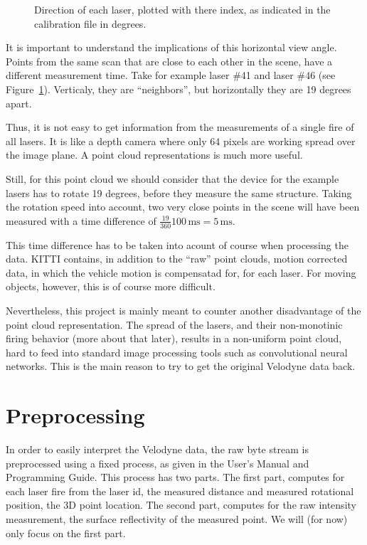 \documentclass[english]{article}
\begin{document}
\begin{figure}
    \centering
    \def\svgwidth{\columnwidth}
    \scalebox{0.9}{
    \def\svgwidth{.6 \columnwidth}
      
    }
    \caption{Direction of each laser, plotted with there index, as
    indicated in the calibration file in degrees.}
		\label{fig:directions}
\end{figure}

It is important to understand the implications of this horizontal view
angle. Points from the same scan that are close to each other in the
scene, have a different measurement time. Take for example laser \#41
and laser \#46 (see Figure~\ref{fig:directions}). Verticaly, they are
``neighbors'', but horizontally they are 19 degrees apart.

Thus, it is not easy to get information from the measurements of a
single fire of all lasers. It is like a depth camera where only 64
pixels are working spread over the image plane. A point cloud
representations is much more useful.

Still, for this point cloud we should consider that the device for the
example lasers has to rotate 19 degrees, before they measure the same
structure. Taking the rotation speed into account, two very close points
in the scene will have been measured with a time difference of
$\frac{19}{360} 100 \, \mbox{ms}= 5 \, \mbox{ms}$.

This time difference has to be taken into acount of course when
processing the data. KITTI contains, in addition to the ``raw'' point
clouds, motion corrected data, in which the vehicle motion is
compensatad for, for each laser. For moving objects, however, this is of
course more difficult.

Nevertheless, this project is mainly meant to counter another
disadvantage of the point cloud representation. The spread of the
lasers, and their non-monotinic firing behavior (more about that later),
results in a non-uniform point cloud, hard to feed into standard image
processing tools such as convolutional neural networks. This is the main
reason to try to get the original Velodyne data back.

\section{Preprocessing}
\label{sec:preproc}
In order to easily interpret the Velodyne data, the raw byte stream is
preprocessed using a fixed process, as given in the User's Manual and
Programming Guide. This process has two parts. The first part, computes for
each laser fire from the laser id, the measured distance and measured
rotational position, the 3D point location. The second part, computes
for the raw intensity measurement, the surface reflectivity of the
measured point. We will (for now) only focus on the first part.
\end{document}
